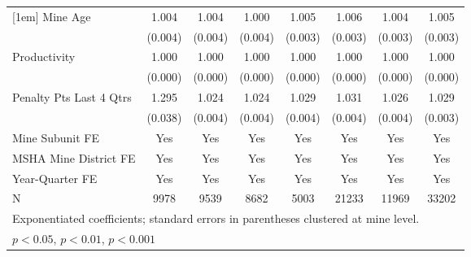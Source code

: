 {\begin{tabular}{l*{7}{c}}
[1em]
Mine Age                 &       1.004         &       1.004         &       1.000         &       1.005         &       1.006         &       1.004         &       1.005         \\
                         &     (0.004)         &     (0.004)         &     (0.004)         &     (0.003)         &     (0.003)         &     (0.003)         &     (0.003)         \\
[1em]
Productivity             &       1.000         &       1.000\sym{*}  &       1.000         &       1.000         &       1.000         &       1.000         &       1.000         \\
                         &     (0.000)         &     (0.000)         &     (0.000)         &     (0.000)         &     (0.000)         &     (0.000)         &     (0.000)         \\
[1em]
Penalty Pts Last 4 Qtrs  &       1.295\sym{***}&       1.024\sym{***}&       1.024\sym{***}&       1.029\sym{***}&       1.031\sym{***}&       1.026\sym{***}&       1.029\sym{***}\\
                         &     (0.038)         &     (0.004)         &     (0.004)         &     (0.004)         &     (0.004)         &     (0.004)         &     (0.003)         \\
[1em]
Mine Subunit FE          &         Yes         &         Yes         &         Yes         &         Yes         &         Yes         &         Yes         &         Yes         \\
[1em]
MSHA Mine District FE    &         Yes         &         Yes         &         Yes         &         Yes         &         Yes         &         Yes         &         Yes         \\
[1em]
Year-Quarter FE          &         Yes         &         Yes         &         Yes         &         Yes         &         Yes         &         Yes         &         Yes         \\
\hline
N                        &        9978         &        9539         &        8682         &        5003         &       21233         &       11969         &       33202         \\
\hline\hline
\multicolumn{8}{l}{\footnotesize Exponentiated coefficients; standard errors in parentheses clustered at mine level.}\\
\multicolumn{8}{l}{\footnotesize \sym{*} \(p<0.05\), \sym{**} \(p<0.01\), \sym{***} \(p<0.001\)}\\
\end{tabular}
}
